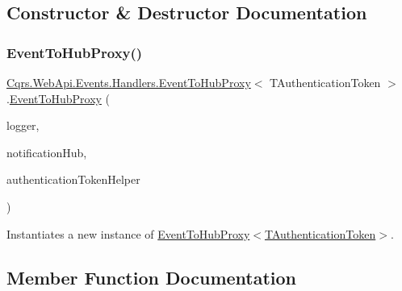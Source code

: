 \subsection{Constructor \& Destructor Documentation}
\mbox{\label{classCqrs_1_1WebApi_1_1Events_1_1Handlers_1_1EventToHubProxy_a11ce35ab8f01b97b95b757e246c9cdcd_a11ce35ab8f01b97b95b757e246c9cdcd}} 
\subsubsection{\texorpdfstring{Event\+To\+Hub\+Proxy()}{EventToHubProxy()}}
{\footnotesize\ttfamily \hyperlink{classCqrs_1_1WebApi_1_1Events_1_1Handlers_1_1EventToHubProxy}{Cqrs.\+Web\+Api.\+Events.\+Handlers.\+Event\+To\+Hub\+Proxy}$<$ T\+Authentication\+Token $>$.\hyperlink{classCqrs_1_1WebApi_1_1Events_1_1Handlers_1_1EventToHubProxy}{Event\+To\+Hub\+Proxy} (\begin{DoxyParamCaption}\item[{I\+Logger}]{logger,  }\item[{\hyperlink{interfaceCqrs_1_1WebApi_1_1SignalR_1_1Hubs_1_1INotificationHub}{I\+Notification\+Hub}}]{notification\+Hub,  }\item[{\hyperlink{interfaceCqrs_1_1Authentication_1_1IAuthenticationTokenHelper}{I\+Authentication\+Token\+Helper}$<$ T\+Authentication\+Token $>$}]{authentication\+Token\+Helper }\end{DoxyParamCaption})\hspace{0.3cm}{\ttfamily [protected]}}



Instantiates a new instance of \hyperlink{classCqrs_1_1WebApi_1_1Events_1_1Handlers_1_1EventToHubProxy_a11ce35ab8f01b97b95b757e246c9cdcd_a11ce35ab8f01b97b95b757e246c9cdcd}{Event\+To\+Hub\+Proxy$<$\+T\+Authentication\+Token$>$}. 



\subsection{Member Function Documentation}
\mbox{\label{classCqrs_1_1WebApi_1_1Events_1_1Handlers_1_1EventToHubProxy_a310fc8d40bfbe514406716150f30b74d_a310fc8d40bfbe514406716150f30b74d}} 
